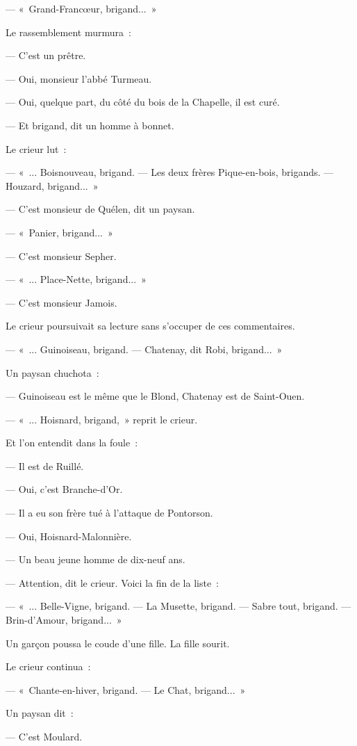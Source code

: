 \documentclass[french,twoside]{book} %
\begin{document}
— « Grand-Francœur, brigand... »\par
Le rassemblement murmura :\par
— C’est un prêtre.\par
— Oui, monsieur l’abbé Turmeau.\par
— Oui, quelque part, du côté du bois de la Chapelle, il est curé.\par
— Et brigand, dit un homme à bonnet.\par
Le crieur lut :\par
— « ... Boisnouveau, brigand. — Les deux frères Pique-en-bois, brigands. — Houzard, brigand... »\par
— C’est monsieur de Quélen, dit un paysan.\par
— « Panier, brigand... »\par
— C’est monsieur Sepher.\par
— « ... Place-Nette, brigand... »\par
— C’est monsieur Jamois.\par
Le crieur poursuivait sa lecture sans s’occuper de ces commentaires.\par
— « ... Guinoiseau, brigand. — Chatenay, dit Robi, brigand... »\par
Un paysan chuchota :\par
— Guinoiseau est le même que le Blond, Chatenay est de Saint-Ouen.\par
— « ... Hoisnard, brigand, » reprit le crieur.\par
Et l’on entendit dans la foule :\par
— Il est de Ruillé.\par
— Oui, c’est Branche-d’Or.\par
— Il a eu son frère tué à l’attaque de Pontorson.\par
— Oui, Hoisnard-Malonnière.\par
— Un beau jeune homme de dix-neuf ans.\par
 — Attention, dit le crieur. Voici la fin de la liste :\par
— « ... Belle-Vigne, brigand. — La Musette, brigand. — Sabre tout, brigand. — Brin-d’Amour, brigand... »\par
Un garçon poussa le coude d’une fille. La fille sourit.\par
Le crieur continua :\par
— « Chante-en-hiver, brigand. — Le Chat, brigand... »\par
Un paysan dit :\par
— C’est Moulard.\par
\end{document}
